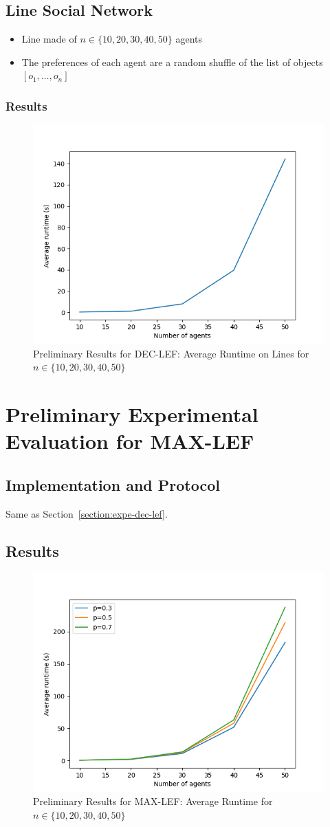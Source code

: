 \documentclass{article}
\begin{document}
\subsection{Line Social Network}
\begin{itemize}
	\item Line made of $n \in \{10, 20, 30, 40, 50\}$ agents
	\item The preferences of each agent are a random shuffle of the list of objects $[o_1,\dots,o_n]$
\end{itemize}

\subsubsection{Results}
\begin{figure}[htb]
\centering
\includegraphics[width=0.5\linewidth]{prelim-line-results.png}
\caption{Preliminary Results for DEC-LEF: Average Runtime on Lines for $n \in \{10,20,30,40,50\}$}
\end{figure}

\section{Preliminary Experimental Evaluation for MAX-LEF}
\subsection{Implementation and Protocol}
Same as Section~\ref{section:expe-dec-lef}.

\subsection{Results}
\begin{figure}[htb]
\centering
\includegraphics[width=0.5\linewidth]{prelim-results-optim.png}
\caption{Preliminary Results for MAX-LEF: Average Runtime for $n \in \{10,20,30,40,50\}$}
\end{figure}
\end{document}

